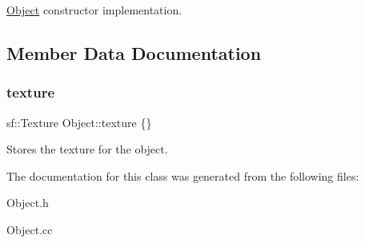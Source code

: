 \hyperlink{classObject}{Object} constructor implementation. 

\subsection{Member Data Documentation}
\mbox{\label{classObject_a8abc6192982ee39b2dc9d9b05cc155ee}} 
\subsubsection{\texorpdfstring{texture}{texture}}
{\footnotesize\ttfamily sf\+::\+Texture Object\+::texture \{\}\hspace{0.3cm}{\ttfamily [protected]}}

Stores the texture for the object. 

The documentation for this class was generated from the following files\+:\begin{DoxyCompactItemize}
\item 
Object.\+h\item 
Object.\+cc\end{DoxyCompactItemize}
